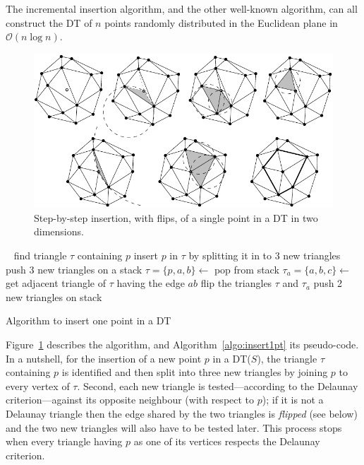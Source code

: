 The incremental insertion algorithm, and the other well-known algorithm, can all construct the DT of $n$ points randomly distributed in the Euclidean plane in $\mathcal{O}(n \log n)$.


\begin{figure}
  \centering
  \includegraphics[width=\textwidth]{figs/insertion_steps}
  \caption{Step-by-step insertion, with flips, of a single point in a DT in two dimensions.}%
\label{fig:insertion_steps}
\end{figure}
\begin{algorithm}[tb] 
  \DontPrintSemicolon\
  find triangle $\tau$ containing $p$\;
  insert $p$ in $\tau$ by splitting it in to 3 new triangles\;
  push 3 new triangles on a stack\;
  {
    $\tau = \{p,a,b\} \leftarrow$ pop from stack\;
    $\tau_{a} = \{a,b,c\} \leftarrow$ get adjacent triangle of $\tau$ having the edge $ab$\;
    \If{$c$ is inside circumcircle of $\tau$}
    {
      flip the triangles $\tau$ and $\tau_{a}$\;
      push 2 new triangles on stack\;
    }
  }
  \caption{Algorithm to insert one point in a DT}%
\label{algo:insert1pt}
\end{algorithm} 

Figure~\ref{fig:insertion_steps} describes the algorithm, and Algorithm~\ref{algo:insert1pt} its pseudo-code. 
In a nutshell, for the insertion of a new point $p$ in a DT($S$), the triangle $\tau$ containing $p$ is identified and then split into three new triangles by joining $p$ to every vertex of $\tau$. 
Second, each new triangle is tested---according to the Delaunay criterion---against its opposite neighbour (with respect to $p$); if it is not a Delaunay triangle then the edge shared by the two triangles is \emph{flipped} (see below) and the two new triangles will also have to be tested later. 
This process stops when every triangle having $p$ as one of its vertices respects the Delaunay criterion.


